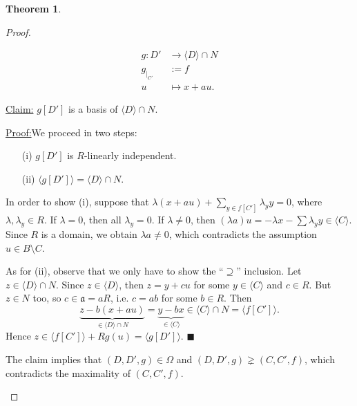 \documentclass[12pt,a4paper]{report}
\theoremstyle{definition}
\newtheorem{theorem}{Theorem}[chapter] %
\theoremstyle{num.custom-title}
\newenvironment{claim}[1]{\par\noindent\underline{Claim#1:}\space}{} %
\newenvironment{claimproof}[1]{\par\noindent\underline{Proof:}\space#1}{\leavevmode\unskip\penalty9999 \hbox{}\nobreak\hfill\quad\hbox{$\blacksquare$}} %
\DeclareMathOperator{\sm}{\setminus}
\begin{document}
\begin{theorem}
\begin{proof}
\begin{enumerate}
\begin{align*}
g \colon D' &\to \langle D \rangle \cap N \\
g_{|_{C'}} &:= f \\
u &\mapsto x + au.
\end{align*}
\begin{claim}{}
$g[D']$ is a basis of $\langle D \rangle \cap N$.
\begin{claimproof}
We proceed in two steps:
\begin{enumerate}
\item[(i)] $g[D']$ is $R$-linearly independent.
\item[(ii)] $\langle g[D'] \rangle = \langle D \rangle \cap N$.
\end{enumerate}
In order to show (i), suppose that $\lambda(x+au) + \sum_{y \in f[C']} \lambda_y y =0$, where $\lambda,\lambda_y \in R$. If $\lambda = 0$, then all $\lambda_y = 0$. If $\lambda \neq 0$, then $(\lambda a) u = -\lambda x - \sum \lambda_y y \in \langle C \rangle$. Since $R$ is a domain, we obtain $\lambda a \neq 0$, which contradicts the assumption $u \in B \sm C$.

As for (ii), observe that we only have to show the ``$\supseteq$'' inclusion. Let $z \in \langle D \rangle \cap N$. Since $z \in \langle D \rangle$, then $z = y+cu$ for some $y \in \langle C \rangle$ and $c \in R$. But $z \in N$ too, so $c \in \mathfrak{a} = aR$, i.e. $c=ab$ for some $b \in R$. Then 
\[
\underbrace{z-b(x+au)}_{\in \langle D \rangle \cap N} = \underbrace{y-bx}_{\in \langle C \rangle} \in \langle C \rangle \cap N = \langle f[C'] \rangle.
\]
Hence $z \in \langle f[C'] \rangle + R g(u) = \langle g[D'] \rangle$.
\end{claimproof}
\end{claim}

The claim implies that $(D,D',g) \in \Omega$ and $(D,D',g) \gneq (C,C',f)$, which contradicts the maximality of $(C,C',f)$.
\end{enumerate}
\end{proof}
\end{theorem}
\end{document}
